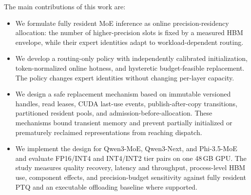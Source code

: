 The main contributions of this work are:
\begin{itemize}[leftmargin=1.5em, itemsep=1pt, topsep=2pt]
  \item We formulate fully resident MoE inference as online precision-residency allocation: the number of higher-precision slots is fixed by a measured HBM envelope, while their expert identities adapt to workload-dependent routing.
  \item We develop a routing-only policy with independently calibrated initialization, token-normalized online hotness, and hysteretic budget-feasible replacement. The policy changes expert identities without changing per-layer capacity.
  \item We design a safe replacement mechanism based on immutable versioned handles, read leases, CUDA last-use events, publish-after-copy transitions, partitioned resident pools, and admission-before-allocation. These mechanisms bound transient memory and prevent partially initialized or prematurely reclaimed representations from reaching dispatch.
  \item We implement the design for Qwen3-MoE, Qwen3-Next, and Phi-3.5-MoE and evaluate FP16/INT4 and INT4/INT2 tier pairs on one 48\,GB GPU. The study measures quality recovery, latency and throughput, process-level HBM use, component effects, and precision-budget sensitivity against fully resident PTQ and an executable offloading baseline where supported.
\end{itemize}
